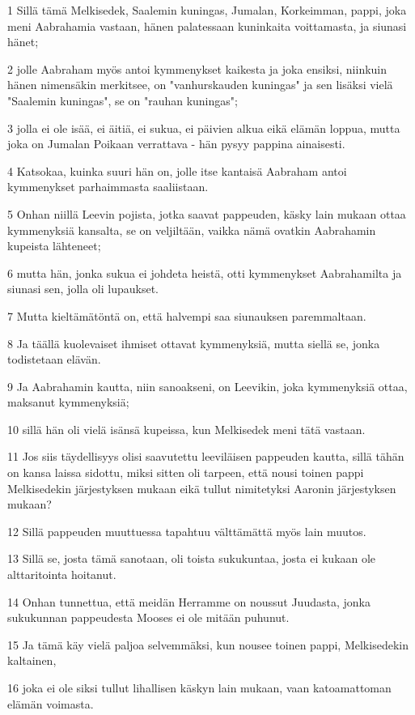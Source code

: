 \par 1 Sillä tämä Melkisedek, Saalemin kuningas, Jumalan, Korkeimman, pappi, joka meni Aabrahamia vastaan, hänen palatessaan kuninkaita voittamasta, ja siunasi hänet;
\par 2 jolle Aabraham myös antoi kymmenykset kaikesta ja joka ensiksi, niinkuin hänen nimensäkin merkitsee, on "vanhurskauden kuningas" ja sen lisäksi vielä "Saalemin kuningas", se on "rauhan kuningas";
\par 3 jolla ei ole isää, ei äitiä, ei sukua, ei päivien alkua eikä elämän loppua, mutta joka on Jumalan Poikaan verrattava - hän pysyy pappina ainaisesti.
\par 4 Katsokaa, kuinka suuri hän on, jolle itse kantaisä Aabraham antoi kymmenykset parhaimmasta saaliistaan.
\par 5 Onhan niillä Leevin pojista, jotka saavat pappeuden, käsky lain mukaan ottaa kymmenyksiä kansalta, se on veljiltään, vaikka nämä ovatkin Aabrahamin kupeista lähteneet;
\par 6 mutta hän, jonka sukua ei johdeta heistä, otti kymmenykset Aabrahamilta ja siunasi sen, jolla oli lupaukset.
\par 7 Mutta kieltämätöntä on, että halvempi saa siunauksen paremmaltaan.
\par 8 Ja täällä kuolevaiset ihmiset ottavat kymmenyksiä, mutta siellä se, jonka todistetaan elävän.
\par 9 Ja Aabrahamin kautta, niin sanoakseni, on Leevikin, joka kymmenyksiä ottaa, maksanut kymmenyksiä;
\par 10 sillä hän oli vielä isänsä kupeissa, kun Melkisedek meni tätä vastaan.
\par 11 Jos siis täydellisyys olisi saavutettu leeviläisen pappeuden kautta, sillä tähän on kansa laissa sidottu, miksi sitten oli tarpeen, että nousi toinen pappi Melkisedekin järjestyksen mukaan eikä tullut nimitetyksi Aaronin järjestyksen mukaan?
\par 12 Sillä pappeuden muuttuessa tapahtuu välttämättä myös lain muutos.
\par 13 Sillä se, josta tämä sanotaan, oli toista sukukuntaa, josta ei kukaan ole alttaritointa hoitanut.
\par 14 Onhan tunnettua, että meidän Herramme on noussut Juudasta, jonka sukukunnan pappeudesta Mooses ei ole mitään puhunut.
\par 15 Ja tämä käy vielä paljoa selvemmäksi, kun nousee toinen pappi, Melkisedekin kaltainen,
\par 16 joka ei ole siksi tullut lihallisen käskyn lain mukaan, vaan katoamattoman elämän voimasta.
